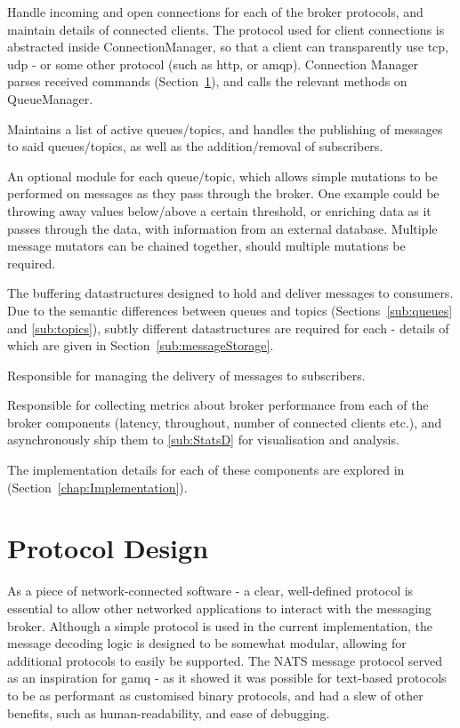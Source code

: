 \begin{description}[style=nextline]
  \item[Connection Manager]
  Handle incoming and open connections for each of the broker protocols, and
  maintain details of connected clients. The protocol used for client
  connections is abstracted inside ConnectionManager, so that a client can
  transparently use \gls{tcp}, \gls{udp} - or some other protocol (such as
  \gls{http}, or \gls{amqp}). Connection Manager parses received commands
  (Section~\ref{sec:protocol}), and calls the relevant methods on QueueManager.
  \item[Queue Manager]
  Maintains a list of active queues/topics, and handles the publishing of
  messages to said queues/topics, as well as the addition/removal of
  subscribers.
  \item[Message Mutators]
  An optional module for each queue/topic, which allows simple mutations to be
  performed on messages as they pass through the broker. One example could be
  throwing away values below/above a certain threshold, or enriching data as it
  passes through the data, with information from an external database. Multiple
  message mutators can be chained together, should multiple mutations be
  required.
  \item[Queue/Topics]
  The buffering datastructures designed to hold and deliver messages to
  consumers. Due to the semantic differences between queues and topics
  (Sections~\ref{sub:queues} and \ref{sub:topics}), subtly different
  datastructures are required for each - details of which are given in
  Section~\ref{sub:messageStorage}.
  \item[Message Shippers]
  Responsible for managing the delivery of messages to subscribers.
  \item[Metric Manager]
  Responsible for collecting metrics about broker performance from each of the
  broker components (latency, throughout, number of connected clients etc.), and
  asynchronously ship them to \ref{sub:StatsD} for visualisation and analysis.
\end{description}

The implementation details for each of these components are explored in
(Section~\ref{chap:Implementation}).

\section{Protocol Design}
\label{sec:protocol}

As a piece of network-connected software - a clear, well-defined protocol is
essential to allow other networked applications to interact with the messaging
broker. Although a simple protocol is used in the current implementation, the
message decoding logic is designed to be somewhat modular, allowing for
additional protocols to easily be supported. The NATS message
protocol\cite{natsProtocol} served as an inspiration for \gls{gamq} - as it showed it
was possible for text-based protocols to be as performant as customised binary
protocols, and had a slew of other benefits, such as human-readability, and ease
of debugging.

